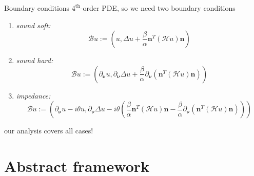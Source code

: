 \documentclass[11pt,aspectratio=169,xcolor=dvipsnames]{beamer}
\newcommand{\nicearrow}[2]{\raisebox{#2}{\resizebox{0.45cm}{!}{\color{#1}{\MVRightArrow}\color{black}}}}
\begin{document}
\begin{frame}{Boundary conditions\footnotemark}
  \nicearrow{GOE}{-0.07cm} $4^{\text{th}}$-order PDE, so we need two boundary conditions
  \begin{enumerate}
    \item \emph{sound soft:}
    \begin{equation*}
      \mathcal{B}u := (u, \Delta u + \frac{\beta}{\alpha} \bm{n}^T (\mathcal{H} u) \bm{n})
    \end{equation*}
    \item \emph{sound hard:}
    \begin{equation*}
      \mathcal{B}u := (\partial_{\bm{\nu}} u, \partial_{\bm{\nu}} \Delta u + \frac{\beta}{\alpha} \partial_{\bm{\nu}}(\bm{n}^T (\mathcal{H} u) \bm{n}))
    \end{equation*}
    \item \emph{impedance:}
    \begin{equation*}
      \mathcal{B}u := (\partial_{\bm{\nu}} u - i \theta u, \partial_{\bm{\nu}} \Delta u - i \theta(\frac{\beta}{\alpha} \bm{n}^T (\mathcal{H} u) \bm{n} - \frac{\beta}{\alpha} \partial_{\bm{\nu}}(\bm{n}^T (\mathcal{H} u) \bm{n})))
    \end{equation*}
  \end{enumerate}
  \nicearrow{GOE}{-0.07cm} our analysis covers all cases!
\end{frame}


\section{Abstract framework}
\mysectionpage
\end{document}
